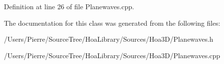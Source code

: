 Definition at line 26 of file Planewaves.\-cpp.



The documentation for this class was generated from the following files\-:\begin{DoxyCompactItemize}
\item 
/\-Users/\-Pierre/\-Source\-Tree/\-Hoa\-Library/\-Sources/\-Hoa3\-D/Planewaves.\-h\item 
/\-Users/\-Pierre/\-Source\-Tree/\-Hoa\-Library/\-Sources/\-Hoa3\-D/Planewaves.\-cpp\end{DoxyCompactItemize}
